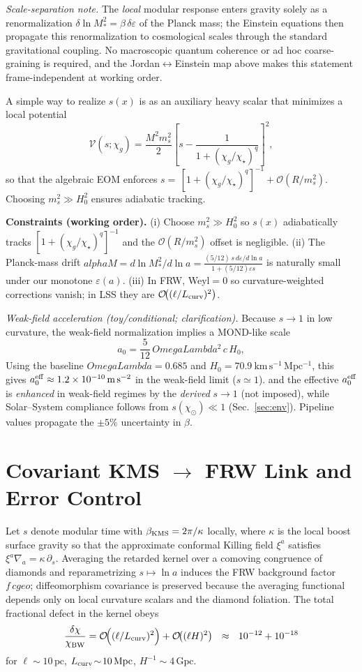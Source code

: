 \documentclass[aps,prd,onecolumn,superscriptaddress,nofootinbib]{revtex4-2}
\def\OmL{OmegaLambda}%
\def\cgeo{cgeo}%
\def\alpha{alpha}%
\def\alpha_M{alphaM}%
\def\Omega_\Lambda{OmegaLambda}%
\providecommand{\OmL}{\Omega_\Lambda}
\providecommand{\cgeo}{c_{\rm geo}}
\providecommand{\be}{\begin{equation}}
\providecommand{\ee}{\end{equation}}
\begin{document}
\noindent\emph{Scale-separation note.} The \emph{local} modular response enters gravity solely as a renormalization $\delta\!\ln M_*^2=\beta\,\delta\varepsilon$ of the Planck mass; the Einstein equations then propagate this renormalization to cosmological scales through the standard gravitational coupling. No macroscopic quantum coherence or ad hoc coarse-graining is required, and the Jordan\(\leftrightarrow\)Einstein map above makes this statement frame-independent at working order.

A simple way to realize $s(x)$ is as an auxiliary heavy scalar that minimizes a local potential
\[
\mathcal V(s;\chi_g)=\frac{M^2 m_s^2}{2}\left[s-\frac{1}{1+(\chi_g/\chi_\star)^q}\right]^2,
\]
so that the algebraic EOM enforces $s=\,[1+(\chi_g/\chi_\star)^q]^{-1}+\mathcal O(R/m_s^2)$. Choosing $m_s^2\!\gg\!H_0^2$ ensures adiabatic tracking.

\noindent\textbf{Constraints (working order).}
(i) Choose $m_s^2\gg H_0^2$ so $s(x)$ adiabatically tracks $[1+(\chi_g/\chi_\star)^q]^{-1}$ and the $\mathcal O(R/m_s^2)$ offset is negligible.
(ii) The Planck-mass drift $\alpha_M=d\ln M_*^2/d\ln a=\frac{(5/12)\,s\,d\varepsilon/d\ln a}{1+(5/12)\varepsilon s}$ is naturally small under our monotone $\varepsilon(a)$.
(iii) In FRW, Weyl$=0$ so curvature-weighted corrections vanish; in LSS they are $\mathcal O\!\big((\ell/L_{\rm curv})^2\big)$.

\noindent \emph{Weak-field acceleration (toy/conditional; clarification).} Because $s\!\to\!1$ in low curvature, the weak-field normalization implies a MOND-like scale
\be
a_0=\frac{5}{12}\,\OmL^2\,c\,H_0,
\ee
Using the baseline \(\OmL=0.685\) and \(H_0=70.9~\mathrm{km\,s^{-1}\,Mpc^{-1}}\), this gives \(a_0^{\rm eff}\approx 1.2\times 10^{-10}\,\mathrm{m\,s^{-2}}\) in the weak-field limit (\(s\simeq 1\)).
and the effective $a_0^{\rm eff}$ is \emph{enhanced} in weak-field regimes by the \emph{derived} $s\!\to\!1$ (not imposed), while Solar–System compliance follows from $s(\chi_\odot)\ll 1$ (Sec.~\ref{sec:env}). Pipeline values propagate the \(\pm 5\%\) uncertainty in \(\beta\).

\section{Covariant KMS \texorpdfstring{$\to$}{->} FRW Link and Error Control}
\label{sec:kms-frw}
Let \(s\) denote modular time with \(\beta_{\rm KMS}=2\pi/\kappa\) locally, where \(\kappa\) is the local boost surface gravity so that the approximate conformal Killing field \(\xi^a\) satisfies \(\xi^a\nabla_a=\kappa\,\partial_s\).
Averaging the retarded kernel over a comoving congruence of diamonds and reparametrizing \(s\mapsto \ln a\) induces the FRW background factor \(f\,\cgeo\); diffeomorphism covariance is preserved because the averaging functional depends only on local curvature scalars and the diamond foliation. The total fractional defect in the kernel obeys
\be
\label{eq:chi-defect}
\frac{\delta\chi}{\chi_{\rm BW}}=\mathcal O\!\Big((\ell/L_{\rm curv})^2\Big)+\mathcal O\!\big((\ell H)^2\big)
\ \ \approx\ \ 10^{-12}+10^{-18}
\ee
for \(\ell\!\sim\!10\,\mathrm{pc}\), \(L_{\rm curv}\!\sim\!10\,\mathrm{Mpc}\), \(H^{-1}\!\sim\!4\,\mathrm{Gpc}\).
\end{document}
